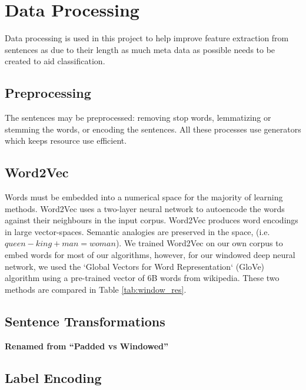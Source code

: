 \section{Data Processing}
\label{sec:data_processing}

Data processing is used in this project to help improve feature extraction from sentences as due to their length as much meta data as possible needs to be created to aid classification.

  \subsection{Preprocessing}
  \label{sec:preprocessing}
    The sentences may be preprocessed: removing stop words, lemmatizing or
    stemming the words, or encoding the sentences. All these processes use
    generators which keeps resource use efficient.

  \subsection{Word2Vec}
  \label{sec:word2vec}
  Words must be embedded into a numerical space for the majority of learning methods. Word2Vec uses a two-layer neural network to autoencode the words against their neighbours in the input corpus. Word2Vec produces word encodings in large vector-spaces. Semantic analogies are preserved in the space, (i.e. $queen - king + man = woman$). We trained Word2Vec on our own corpus to embed words for most of our algorithms, however, for our windowed deep neural network, we used the `Global Vectors for Word Representation` (GloVe) algorithm using a pre-trained vector of 6B words from wikipedia. These two methods are compared in Table \ref{tab:window_res}.

  \subsection{Sentence Transformations}
  \label{sec:sentence_transformations}
    \textbf{Renamed from ``Padded vs Windowed''}

  \subsection{Label Encoding}
  \label{sec:label_encoding}
